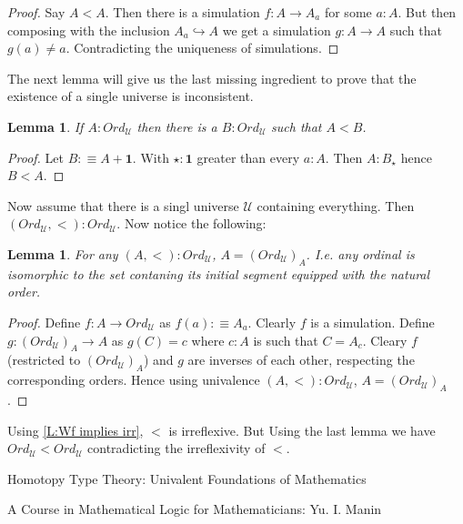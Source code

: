 \documentclass[11pt]{article}
\theoremstyle{definition}
\theoremstyle{plain}
\newtheorem{lemma}[definition]{Lemma}
\theoremstyle{remark}
\newcommand{\U}{\mathscr{U}}
\begin{document}
\begin{proof}
Say $A < A$. Then there is a simulation $f : A \to A_a$ for some $a : A$. But then composing
with the inclusion $A_a \hookrightarrow A$ we get a simulation $g : A \to A$ such that
$g(a) \neq a$. Contradicting the uniqueness of simulations.
\end{proof}

The next lemma will give us the last missing ingredient to prove that the existence of a single
universe is inconsistent.

\begin{lemma}\label{L:succ of ord}
If $A : Ord_{\U}$ then there is a $B : Ord_{\U}$ such that $A < B$. 
\end{lemma}

\begin{proof}
Let $B :\equiv A + \mathbf{1}$. With $\star : \mathbf{1}$ greater than every $a : A$. Then
$A : B_{\star}$ hence $B < A$.
\end{proof}

Now assume that there is a singl universe $\U$ containing everything. Then 
$(Ord_{\U},<) : Ord_{\U}$. Now notice the following:

\begin{lemma}\label{L:A<Ord}
For any $(A, <) : Ord_{\U}$, $A = (Ord_{\U})_A$. I.e. any ordinal is isomorphic to the
set contaning its initial segment equipped with the natural order.
\end{lemma}

\begin{proof}
Define $f : A \to Ord_{\U}$ as $f(a) :\equiv A_a$. Clearly $f$ is a simulation. Define
$g : (Ord_{\U})_A \to A$ as $g(C) = c$ where $c : A$ is such that $C = A_c$. Cleary $f$
(restricted to $(Ord_{\U})_A$) and $g$ are inverses of each other, respecting the 
corresponding orders. Hence using univalence $(A, <) : Ord_{\U}$, $A = (Ord_{\U})_A$.
\end{proof}

Using \ref{L:Wf implies irr}, $<$ is irreflexive. But Using the last lemma we have 
$Ord_{\U} < Ord_{\U}$ contradicting the irreflexivity of $<$.

\begin{thebibliography}{99}

Homotopy Type Theory: Univalent Foundations of Mathematics

A Course in Mathematical Logic for Mathematicians: Yu. I. Manin 

\end{thebibliography}
\end{document}
